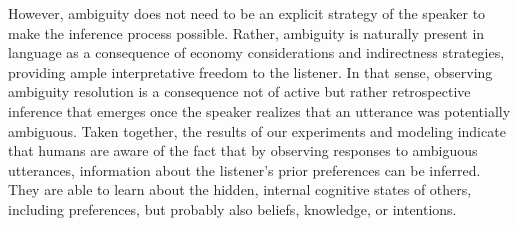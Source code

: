\documentclass[11pt,a4paper]{article}
\newcommand{\gcs}[1]{\textcolor{blue}{[gcs: #1]}}
\begin{document}
However, ambiguity does not need to be an explicit strategy of the speaker to make the inference process possible.
Rather, ambiguity is naturally present in language as a consequence of economy considerations and indirectness strategies, providing ample interpretative freedom to the listener.
In that sense, observing ambiguity resolution is a consequence not of active but rather retrospective inference that emerges once the speaker realizes that an utterance was potentially ambiguous.
Taken together, the results of our experiments and modeling indicate that humans are aware of the fact that by observing responses to ambiguous utterances, information about the listener's prior preferences can be inferred. 
They are able to learn about the hidden, internal cognitive states of others, including preferences, but probably also beliefs, knowledge, or intentions.

 


 

\end{document}
